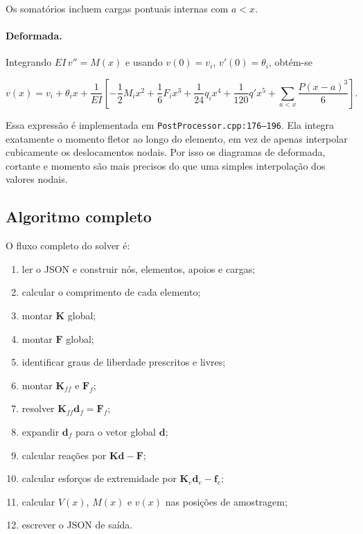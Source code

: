 \documentclass[12pt,a4paper]{article}
\begin{document}
Os somatórios incluem cargas pontuais internas com \(a<x\).

\paragraph{Deformada.}
Integrando \(EI\,v''=M(x)\) e usando \(v(0)=v_i\), \(v'(0)=\theta_i\), obtém-se

\begin{equation}
  v(x) = v_i + \theta_i x
  + \frac{1}{EI}
  \left[
    -\frac{1}{2}M_i x^2
    + \frac{1}{6}F_i x^3
    + \frac{1}{24}q_i x^4
    + \frac{1}{120}q' x^5
    + \sum_{a<x}\frac{P(x-a)^3}{6}
  \right].
  \label{eq:vx}
\end{equation}

Essa expressão é implementada em \texttt{PostProcessor.cpp:176--196}. Ela integra exatamente o momento fletor ao longo do elemento, em vez de apenas interpolar cubicamente os deslocamentos nodais. Por isso os diagramas de deformada, cortante e momento são mais precisos do que uma simples interpolação dos valores nodais.

\subsection{Algoritmo completo}
\label{sec:algoritmo}

O fluxo completo do solver é:

\begin{enumerate}[leftmargin=1.5em]
  \item ler o JSON e construir nós, elementos, apoios e cargas;
  \item calcular o comprimento de cada elemento;
  \item montar \(\mathbf{K}\) global;
  \item montar \(\mathbf{F}\) global;
  \item identificar graus de liberdade prescritos e livres;
  \item montar \(\mathbf{K}_{ff}\) e \(\mathbf{F}_f\);
  \item resolver \(\mathbf{K}_{ff}\mathbf{d}_f=\mathbf{F}_f\);
  \item expandir \(\mathbf{d}_f\) para o vetor global \(\mathbf{d}\);
  \item calcular reações por \(\mathbf{K}\mathbf{d}-\mathbf{F}\);
  \item calcular esforços de extremidade por \(\mathbf{K}_e\mathbf{d}_e-\mathbf{f}_e\);
  \item calcular \(V(x)\), \(M(x)\) e \(v(x)\) nas posições de amostragem;
  \item escrever o JSON de saída.
\end{enumerate}
\end{document}
